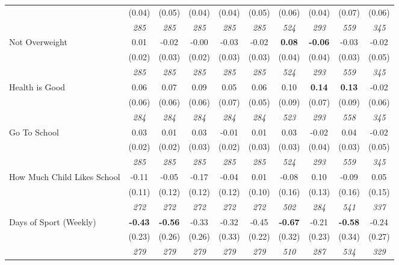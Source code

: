 \begin{tabular}{l c c c c c c c c c}
& (0.04) & (0.05) & (0.04) & (0.04) & (0.05) & (0.06) & (0.04) & (0.07) & (0.06) \\
& \textit{ 285 } & \textit{ 285 } & \textit{ 285 } & \textit{ 285 } & \textit{ 285 } & \textit{ 524 } & \textit{ 293 } & \textit{ 559 } & \textit{ 345 } \\
Not Overweight & 0.01 & -0.02 & -0.00 & -0.03 & -0.02 & \textbf{ 0.08 } & \textbf{-0.06} & -0.03 & -0.02 \\
& (0.02) & (0.03) & (0.02) & (0.03) & (0.03) & (0.04) & (0.04) & (0.03) & (0.05) \\
& \textit{ 285 } & \textit{ 285 } & \textit{ 285 } & \textit{ 285 } & \textit{ 285 } & \textit{ 524 } & \textit{ 293 } & \textit{ 559 } & \textit{ 345 } \\
Health is Good & 0.06 & 0.07 & 0.09 & 0.05 & 0.06 & 0.10 & \textbf{0.14} & \textbf{ 0.13 } & -0.02 \\
& (0.06) & (0.06) & (0.06) & (0.07) & (0.05) & (0.09) & (0.07) & (0.09) & (0.06) \\
& \textit{ 284 } & \textit{ 284 } & \textit{ 284 } & \textit{ 284 } & \textit{ 284 } & \textit{ 523 } & \textit{ 293 } & \textit{ 558 } & \textit{ 345 } \\
Go To School & 0.03 & 0.01 & 0.03 & -0.01 & 0.01 & 0.03 & -0.02 & 0.04 & -0.02 \\
& (0.02) & (0.02) & (0.03) & (0.02) & (0.03) & (0.03) & (0.04) & (0.03) & (0.05) \\
& \textit{ 285 } & \textit{ 285 } & \textit{ 285 } & \textit{ 285 } & \textit{ 285 } & \textit{ 524 } & \textit{ 293 } & \textit{ 559 } & \textit{ 345 } \\
How Much Child Likes School & -0.11 & -0.05 & -0.17 & -0.04 & 0.01 & -0.08 & 0.10 & -0.09 & 0.05 \\
& (0.11) & (0.12) & (0.12) & (0.12) & (0.10) & (0.16) & (0.13) & (0.16) & (0.15) \\
& \textit{ 272 } & \textit{ 272 } & \textit{ 272 } & \textit{ 272 } & \textit{ 272 } & \textit{ 502 } & \textit{ 284 } & \textit{ 541 } & \textit{ 337 } \\
Days of Sport (Weekly) & \textbf{ -0.43 } & \textbf{ -0.56 } & -0.33 & -0.32 & -0.45 & \textbf{ -0.67 } & -0.21 & \textbf{ -0.58 } & -0.24 \\
& (0.23) & (0.26) & (0.26) & (0.33) & (0.22) & (0.32) & (0.23) & (0.34) & (0.27) \\
& \textit{ 279 } & \textit{ 279 } & \textit{ 279 } & \textit{ 279 } & \textit{ 279 } & \textit{ 510 } & \textit{ 287 } & \textit{ 534 } & \textit{ 329 } \\

\end{tabular}

